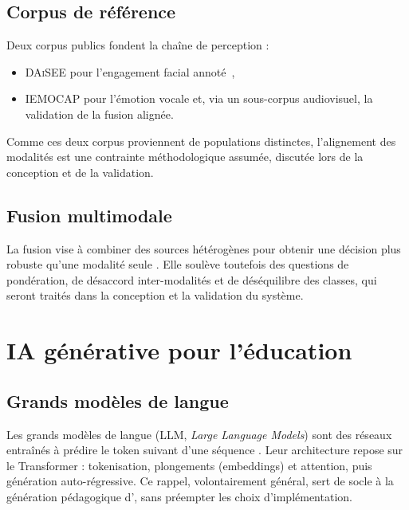 \subsection{Corpus de référence}

Deux corpus publics fondent la chaîne de perception :
\begin{itemize}
  \item \textsc{DAiSEE} \cite{gupta2016daisee} pour l'engagement facial annoté~,
  \item \textsc{IEMOCAP} \cite{busso2008iemocap} pour l'émotion vocale et, via
  un sous-corpus audiovisuel, la validation de la fusion alignée.
\end{itemize}

Comme ces deux corpus proviennent de populations distinctes,
l'alignement des modalités est une contrainte méthodologique assumée,
discutée lors de la conception et de la validation.

\subsection{Fusion multimodale}

La fusion vise à combiner des sources hétérogènes pour obtenir une décision
plus robuste qu'une modalité seule
\cite{liang2024foundations,gandhi2023multimodal}. Elle soulève toutefois des
questions de pondération, de désaccord inter-modalités et de déséquilibre des
classes, qui seront traités dans la conception et la validation du système.

\section{IA générative pour l'éducation}
\label{sec:fond-ia}

\subsection{Grands modèles de langue}

Les grands modèles de langue (LLM, \emph{Large Language Models}) sont des
réseaux entraînés à prédire le token suivant d'une séquence
\cite{brown2020language}. Leur architecture repose sur le Transformer
\cite{vaswani2017attention} : tokenisation,
plongements (embeddings) et attention, puis génération
auto-régressive. Ce rappel, volontairement général, sert de socle à la
génération pédagogique d'\emolearn{}, sans préempter les choix
d'implémentation.

